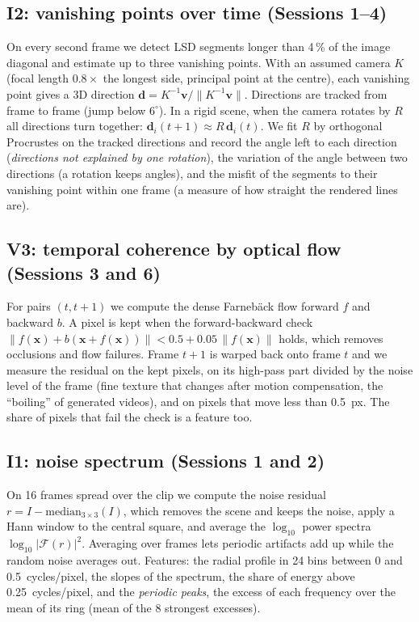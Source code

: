 \documentclass[11pt,a4paper]{article}
\newcommand{\x}{\mathbf{x}}
\begin{document}
\subsection{I2: vanishing points over time (Sessions 1--4)}

On every second frame we detect LSD segments \cite{lsd2010} longer than 4\,\% of the image
diagonal and estimate up to three vanishing points. With an assumed camera
$K$ (focal length $0.8\times$ the longest side, principal point at the centre), each
vanishing point gives a 3D direction $\mathbf{d}=K^{-1}\mathbf{v}/\|K^{-1}\mathbf{v}\|$.
Directions are tracked from frame to frame (jump below $6^\circ$). In a rigid scene, when the
camera rotates by $R$ all directions turn together: $\mathbf{d}_i(t+1)\approx R\,\mathbf{d}_i(t)$.
We fit $R$ by orthogonal Procrustes on the tracked directions and record the angle left to
each direction (\emph{directions not explained by one rotation}), the variation of the angle
between two directions (a rotation keeps angles), and the misfit of the segments to their
vanishing point within one frame (a measure of how straight the rendered lines are).

\subsection{V3: temporal coherence by optical flow (Sessions 3 and 6)}

For pairs $(t,t+1)$ we compute the dense Farneb\"ack flow \cite{farneback2003} forward $f$ and
backward $b$. A pixel is kept when the forward-backward check
$\|f(\x)+b(\x+f(\x))\|<0.5+0.05\,\|f(\x)\|$ holds, which removes occlusions and flow failures.
Frame $t+1$ is warped back onto frame $t$ and we measure the residual on the kept pixels, on
its high-pass part divided by the noise level of the frame (fine texture that changes after
motion compensation, the ``boiling'' of generated videos), and on pixels that move less than
0.5~px. The share of pixels that fail the check is a feature too.

\subsection{I1: noise spectrum (Sessions 1 and 2)}

On 16 frames spread over the clip we compute the noise residual
$r=I-\mathrm{median}_{3\times3}(I)$, which removes the scene and keeps the noise, apply a Hann
window to the central square, and average the $\log_{10}$ power spectra
$\log_{10}|\mathcal{F}(r)|^2$. Averaging over frames lets periodic artifacts add up while the
random noise averages out. Features: the radial profile in 24 bins between 0 and
0.5~cycles/pixel, the slopes of the spectrum, the share of energy above 0.25~cycles/pixel, and
the \emph{periodic peaks}, the excess of each frequency over the mean of its ring (mean of the 8
strongest excesses).
\end{document}
